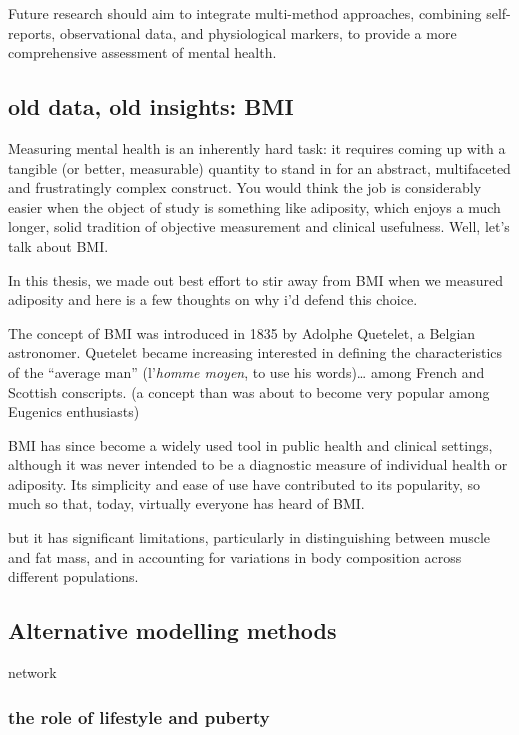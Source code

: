 \documentclass[
  letterpaper,
  DIV=11,
  numbers=noendperiod]{scrreport}
\begin{document}
Future research should aim to integrate multi-method approaches,
combining self-reports, observational data, and physiological markers,
to provide a more comprehensive assessment of mental health.

\subsection{old data, old insights:
BMI}\label{old-data-old-insights-bmi}

Measuring mental health is an inherently hard task: it requires coming
up with a tangible (or better, measurable) quantity to stand in for an
abstract, multifaceted and frustratingly complex construct. You would
think the job is considerably easier when the object of study is
something like adiposity, which enjoys a much longer, solid tradition of
objective measurement and clinical usefulness. Well, let's talk about
BMI.

In this thesis, we made out best effort to stir away from BMI when we
measured adiposity and here is a few thoughts on why i'd defend this
choice.

The concept of BMI was introduced in 1835 by Adolphe Quetelet, a Belgian
astronomer. Quetelet became increasing interested in defining the
characteristics of the ``average man'' (l'\emph{homme moyen}, to use his
words)\ldots{} among French and Scottish conscripts. (a concept than was
about to become very popular among Eugenics enthusiasts)

BMI has since become a widely used tool in public health and clinical
settings, although it was never intended to be a diagnostic measure of
individual health or adiposity. Its simplicity and ease of use have
contributed to its popularity, so much so that, today, virtually
everyone has heard of BMI.

but it has significant limitations, particularly in distinguishing
between muscle and fat mass, and in accounting for variations in body
composition across different populations.

\subsection{Alternative modelling
methods}\label{alternative-modelling-methods-1}

network

\subsubsection{the role of lifestyle and
puberty}\label{the-role-of-lifestyle-and-puberty}
\end{document}
